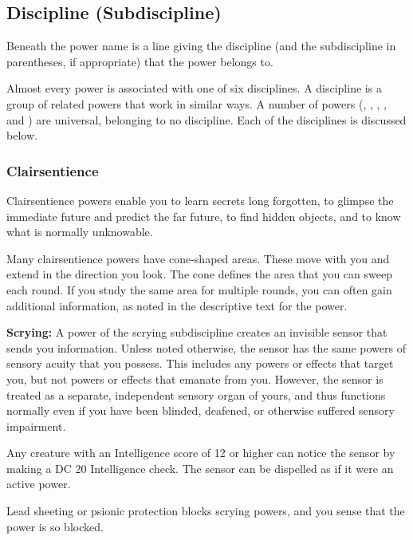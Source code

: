 \subsection{Discipline (Subdiscipline)}
Beneath the power name is a line giving the discipline (and the subdiscipline in parentheses, if appropriate) that the power belongs to.

Almost every power is associated with one of six disciplines. A discipline is a group of related powers that work in similar ways. A number of powers (, , , , and ) are universal, belonging to no discipline. Each of the disciplines is discussed below.

\subsubsection{Clairsentience}
Clairsentience powers enable you to learn secrets long forgotten, to glimpse the immediate future and predict the far future, to find hidden objects, and to know what is normally unknowable.


Many clairsentience powers have cone-shaped areas. These move with you and extend in the direction you look. The cone defines the area that you can sweep each round. If you study the same area for multiple rounds, you can often gain additional information, as noted in the descriptive text for the power.

\textbf{Scrying:} A power of the scrying subdiscipline creates an invisible sensor that sends you information. Unless noted otherwise, the sensor has the same powers of sensory acuity that you possess. This includes any powers or effects that target you, but not powers or effects that emanate from you. However, the sensor is treated as a separate, independent sensory organ of yours, and thus functions normally even if you have been blinded, deafened, or otherwise suffered sensory impairment.

Any creature with an Intelligence score of 12 or higher can notice the sensor by making a DC 20 Intelligence check. The sensor can be dispelled as if it were an active power.

Lead sheeting or psionic protection blocks scrying powers, and you sense that the power is so blocked.


